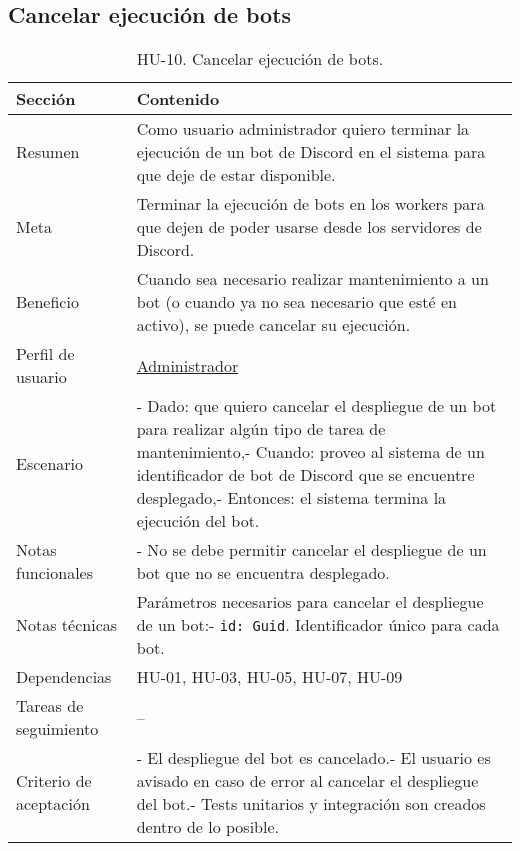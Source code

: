 \subsection{Cancelar ejecución de bots}

\begin{table}[H]
    \centering
    \def\arraystretch{1.25}
    \begin{adjustbox}{max width=\textwidth}
    \begin{tabularx}{\textwidth}{l|L}
    \hline
        \textbf{Sección} & \textbf{Contenido} \\ \hline
    \hline
        Resumen & Como usuario administrador quiero terminar la ejecución de un bot de Discord en el sistema para que deje de estar disponible. \\ \hline
        Meta & Terminar la ejecución de bots en los workers para que dejen de poder usarse desde los servidores de Discord. \\ \hline
        Beneficio & Cuando sea necesario realizar mantenimiento a un bot (o cuando ya no sea necesario que esté en activo), se puede cancelar su ejecución. \\ \hline
        Perfil de usuario & \hyperref[sec:personaAdmin]{Administrador} \\ \hline
        Escenario & - Dado: que quiero cancelar el despliegue de un bot para realizar algún tipo de tarea de mantenimiento,\linebreak - Cuando: proveo al sistema de un identificador de bot de Discord que se encuentre desplegado,\linebreak - Entonces: el sistema termina la ejecución del bot. \\ \hline
        Notas funcionales & - No se debe permitir cancelar el despliegue de un bot que no se encuentra desplegado. \\ \hline
        Notas técnicas & Parámetros necesarios para cancelar el despliegue de un bot:\linebreak - \verb|id: Guid|. Identificador único para cada bot. \\ \hline
        Dependencias & HU-01, HU-03, HU-05, HU-07, HU-09 \\ \hline
        Tareas de seguimiento & – \\ \hline
        Criterio de aceptación & - El despliegue del bot es cancelado.\linebreak - El usuario es avisado en caso de error al cancelar el despliegue del bot.\linebreak - Tests unitarios y integración son creados dentro de lo posible. \\ \hline
    \end{tabularx}
    \end{adjustbox}
    \caption{HU-10. Cancelar ejecución de bots.}
\end{table}


